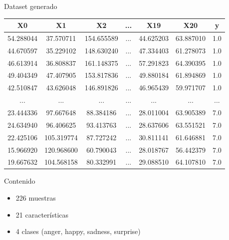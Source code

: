 \documentclass{beamer}
\begin{document}
\begin{frame}{Dataset generado}
\begin{table}
\begin{center}
\begin{adjustbox}{max width=250}
\begin{tabular}{|c|c|c|c|c|c|c|}
     \hline
    \textbf{X0} & \textbf{X1} & \textbf{X2} & \textbf{...} & \textbf{X19} & \textbf{X20} & \textbf{y}\\
    \hline
    54.288044 & 37.570711 & 154.655589 & ... & 44.625203 & 63.887010 & 1.0\\ 
    44.670597 & 35.229102 & 148.630240 & ... & 47.334403 & 61.278073 & 1.0\\
    46.613914 & 36.808837 & 161.148375 & ... & 57.291823 & 64.390395 & 1.0\\
    49.404349 & 47.407905 & 153.817836 & ... & 49.880184 & 61.894869 & 1.0\\
    42.510847 & 43.626048 & 146.891826 & ... & 46.965439 & 59.971707 & 1.0\\
    ... & ... & ... & ... & ... & ... & ...\\
    23.444336 & 97.667648 & 88.384186 & ... & 28.011004 & 63.905389 & 7.0\\
    24.634940 & 96.406625 & 93.413763 & ... & 28.637606 & 63.551521 & 7.0\\
    22.425106 & 105.319774 & 87.727242 & ... & 30.811141 & 61.646881 & 7.0\\
    15.966920 & 120.968600 & 60.790043 & ... & 28.018767 & 56.442379 & 7.0\\
    19.667632 & 104.568158 & 80.332991 & ... & 29.088510 & 64.107810 & 7.0\\
     \hline
 \end{tabular}
 \end{adjustbox}
\end{center}
\end{table}
\begin{block}{Contenido}
\begin{itemize}
    \item 226 muestras
    \item 21 características
    \item 4 clases (anger, happy, sadness, surprise)
\end{itemize}
\end{block}
\end{frame}
\end{document}
